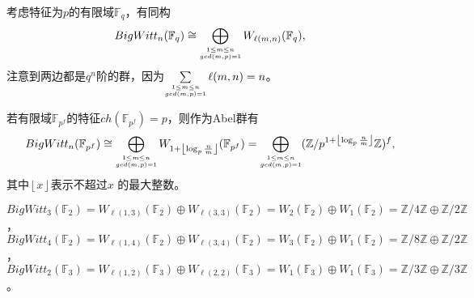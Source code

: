 考虑特征为$p$的有限域$\mathbb{F}_q$，有同构\cite{Lauter1999A}
\[BigWitt_n(\mathbb{F}_{q}) \cong \bigoplus_{\scriptsize\substack{1\leq m\leq n \\ gcd(m,p)=1}} W_{\ell(m,n)}(\mathbb{F}_{q}),\]
注意到两边都是$q^n$阶的群，因为$\sum\limits_{\scriptsize\substack{1\leq m\leq n \\ gcd(m,p)=1}} \ell(m,n) = n$。
\begin{corollary}
\label{cor:BW}
	若有限域$\mathbb{F}_{p^f}$的特征$ch(\mathbb{F}_{p^f})=p$，则作为Abel群有
	\[
	BigWitt_n(\mathbb{F}_{p^f})\cong \bigoplus_{\scriptsize\substack{1\leq m\leq n \\ gcd(m,p)=1}}W_{1+ \left \lfloor\log_p \frac{n}{m}  \right \rfloor}(\mathbb{F}_{p^f}) = \bigoplus_{\scriptsize\substack{1\leq m\leq n \\ gcd(m,p)=1}}(\mathbb{Z}/p^{1+ \left \lfloor\log_p \frac{n}{m}  \right \rfloor}\mathbb{Z})^f,
	\]
	其中$ \left \lfloor x \right \rfloor$表示不超过$x$
	的最大整数。
\end{corollary}
\begin{example}
	$BigWitt_3(\mathbb{F}_2)= W_{\ell(1,3)}(\mathbb{F}_2)\oplus W_{\ell(3,3)}(\mathbb{F}_2)=W_2(\mathbb{F}_2)\oplus W_1(\mathbb{F}_2)=\mathbb{Z}/4 \mathbb{Z}\oplus	\mathbb{Z}/2 \mathbb{Z}$，$BigWitt_4(\mathbb{F}_2)= W_{\ell(1,4)}(\mathbb{F}_2)\oplus W_{\ell(3,4)}(\mathbb{F}_2)=W_3(\mathbb{F}_2)\oplus W_1(\mathbb{F}_2)=\mathbb{Z}/8 \mathbb{Z}\oplus	\mathbb{Z}/2 \mathbb{Z}$，$BigWitt_2(\mathbb{F}_3)= W_{\ell(1,2)}(\mathbb{F}_3)\oplus W_{\ell(2,2)}(\mathbb{F}_3)=W_1(\mathbb{F}_3)\oplus W_1(\mathbb{F}_3)=\mathbb{Z}/3 \mathbb{Z}\oplus	\mathbb{Z}/3 \mathbb{Z}$。

\end{example}










